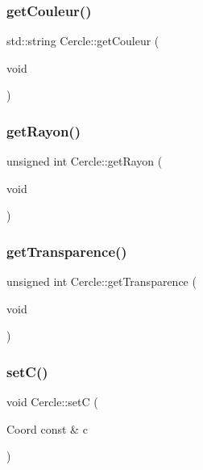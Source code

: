 \mbox{\label{class_cercle_a22efe054905d7f7c0f75a42c8c618c65}} 
\subsubsection{\texorpdfstring{get\+Couleur()}{getCouleur()}}
{\footnotesize\ttfamily std\+::string Cercle\+::get\+Couleur (\begin{DoxyParamCaption}\item[{void}]{ }\end{DoxyParamCaption})}

\mbox{\label{class_cercle_abd14abcaf33d352ea2fb172256756b67}} 
\subsubsection{\texorpdfstring{get\+Rayon()}{getRayon()}}
{\footnotesize\ttfamily unsigned int Cercle\+::get\+Rayon (\begin{DoxyParamCaption}\item[{void}]{ }\end{DoxyParamCaption})}

\mbox{\label{class_cercle_afc9c34b452c3bf951aa910301a84bb01}} 
\subsubsection{\texorpdfstring{get\+Transparence()}{getTransparence()}}
{\footnotesize\ttfamily unsigned int Cercle\+::get\+Transparence (\begin{DoxyParamCaption}\item[{void}]{ }\end{DoxyParamCaption})}

\mbox{\label{class_cercle_ae77c3c453c982054ed3c56656f2596e4}} 
\subsubsection{\texorpdfstring{set\+C()}{setC()}}
{\footnotesize\ttfamily void Cercle\+::setC (\begin{DoxyParamCaption}\item[{Coord const \&}]{c }\end{DoxyParamCaption})}



